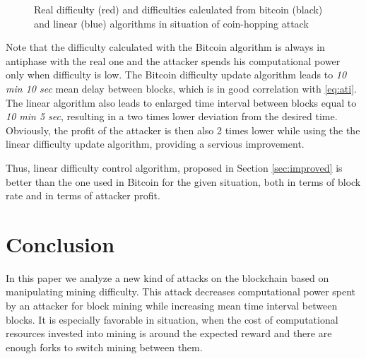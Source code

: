 \documentclass[]{llncs}
\begin{document}
\begin{figure}[h]
\caption{Real difficulty (red) and difficulties calculated from bitcoin (black) and linear (blue) algorithms in situation of coin-hopping attack}
\label{fig:attack}
\end{figure}

Note that the difficulty calculated with the Bitcoin algorithm is always in antiphase with the real one and the attacker spends his computational power only when difficulty is low.
The Bitcoin difficulty update algorithm leads to \textit{10 min 10 sec} mean delay between blocks, which is in good correlation with \ref{eq:ati}.
The linear algorithm also leads to enlarged time interval between blocks equal to \textit{10 min 5 sec}, resulting in a two times lower deviation from the desired time.
Obviously, the profit of the attacker is then also 2 times lower while using the the linear difficulty update algorithm, providing a servious improvement.

Thus, linear difficulty control algorithm, proposed in Section \ref{sec:improved} is better than the one used in Bitcoin for the given situation, both in terms of block rate and in terms of attacker profit.


\section{Conclusion}
\label{sec:concl}
In this paper we analyze a new kind of attacks on the blockchain based on manipulating mining difficulty. This attack decreases computational power spent by an attacker for block mining while increasing mean time interval between blocks. It is especially favorable in situation, when the cost of computational resources invested into mining is around the expected reward and there are enough forks to switch mining between them.
\end{document}
